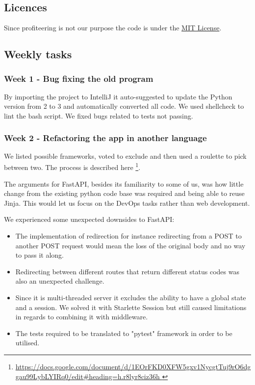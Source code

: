 \documentclass{article}
\begin{document}
\subsection{Licences}

Since profiteering is not our purpose the code is under the \href{https://github.com/MinitwitGroupI/MiniTwit/blob/main/LICENSE}{MIT License}.

\subsection{Weekly tasks}\label{WeeklyTasksSection}


\subsubsection{Week 1 - Bug fixing the old program}

By importing the project to IntelliJ it auto-suggested to update the Python version from 2 to 3 and automatically converted all code. We used shellcheck to lint the bash script. We fixed bugs related to tests not passing.

\subsubsection{Week 2 - Refactoring the app in another language }

We listed possible frameworks, voted to exclude and then used a roulette to pick between two. The process is described here \footnote{\url{https://docs.google.com/document/d/1EOrFKD0XFW5gxv1NycgtTuj9rO6dggau99LybLYIRq0/edit\#heading=h.r8lyr8ciz36h }}. 

The arguments for FastAPI, besides its familiarity to some of us, was how little change from the existing python code base was required and being able to reuse Jinja. This would let us focus on the DevOps tasks rather than web development. 

We experienced some unexpected downsides to FastAPI:
\begin{itemize}
    \item The implementation of redirection for instance redirecting from a POST to another POST request would mean the loss of the original body and no way to pass it along. 
    \item Redirecting between different routes that return different status codes was also an unexpected challenge. 
    \item Since it is multi-threaded server it excludes the ability to have a global state and a session. We solved it with Starlette Session but still caused limitations in regards to combining it with middleware.
    \item The tests required to be translated to "pytest" framework in order to be utilised.
\end{itemize}
\end{document}
